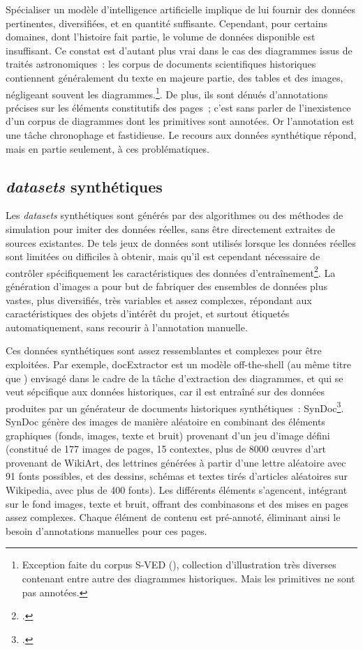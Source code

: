 Spécialiser un modèle d'intelligence artificielle implique de lui
fournir des données pertinentes, diversifiées, et en quantité
suffisante. Cependant, pour certains domaines, dont l'histoire fait
partie, le volume de données disponible est insuffisant. Ce constat est
d'autant plus vrai dans le cas des diagrammes issus de traités
astronomiques~: les corpus de documents scientifiques historiques
contiennent généralement du texte en majeure partie, des tables et des
images, négligeant souvent les diagrammes.\footnote{Exception faite du
  corpus S-VED (\cite{buttner_cordeep_2022}), collection
  d'illustration très diverses contenant entre autre des diagrammes
  historiques. Mais les primitives ne sont pas annotées.}. De plus, ils
sont dénués d'annotations précises sur les éléments constitutifs des
pages~; c'est sans parler de l'inexistence d'un corpus de diagrammes
dont les primitives sont annotées. Or l'annotation est une tâche
chronophage et fastidieuse. Le recours aux données synthétique répond,
mais en partie seulement, à ces problématiques.

\hypertarget{datasets-synthetiques}{%
\subsection{\emph{datasets} synthétiques}\label{datasets-synthetiques}}

Les \textit{datasets} synthétiques sont générés par des algorithmes ou des
méthodes de simulation pour imiter des données réelles, sans être
directement extraites de sources existantes. De tels jeux de données
sont utilisés lorsque les données réelles sont limitées ou difficiles à
obtenir, mais qu'il est cependant nécessaire de contrôler spécifiquement
les caractéristiques des données d'entraînement\footcite{buttner_cordeep_2022}. La génération
d'images a pour but de fabriquer des ensembles de données plus vastes,
plus diversifiés, très variables et assez complexes, répondant aux
caractéristiques des objets d'intérêt du projet, et surtout étiquetés
automatiquement, sans recourir à l'annotation manuelle.

Ces données synthétiques sont assez ressemblantes et complexes pour être
exploitées. Par exemple, docExtractor est un modèle off-the-shell (au
même titre que \yolo) envisagé dans le cadre de la tâche d'extraction des
diagrammes, et qui se veut sépcifique aux données historiques, car il
est entraîné sur des données produites par un générateur de documents
historiques synthétiques~: SynDoc\footcite{monnier_docextractor_2020}. SynDoc
génère des images de manière aléatoire en combinant des éléments
graphiques (fonds, images, texte et bruit) provenant d'un jeu d'image
défini (constitué de 177 images de pages, 15 contextes, plus de 8000
œuvres d'art provenant de WikiArt, des lettrines générées à partir d'une
lettre aléatoire avec 91 fonts possibles, et des dessins, schémas et
textes tirés d'articles aléatoires sur Wikipedia, avec plus de 400
fonts). Les différents éléments s'agencent, intégrant sur le fond
images, texte et bruit, offrant des combinasons et des mises en pages
assez complexes. Chaque élément de contenu est pré-annoté, éliminant
ainsi le besoin d'annotations manuelles pour ces pages.

